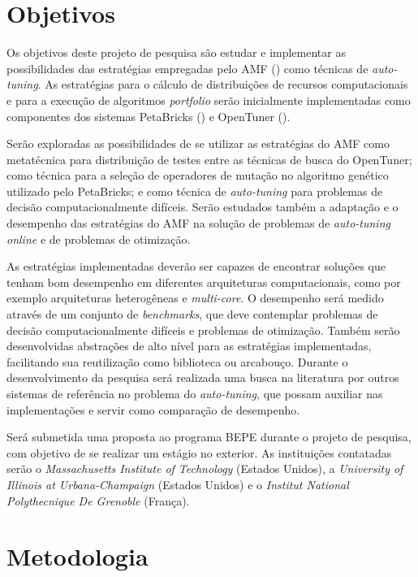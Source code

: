 \documentclass[a4paper, 12pt]{article}
\begin{document}
\section{Objetivos} \label{sec:obj}

Os objetivos deste projeto de pesquisa são estudar e implementar as
possibilidades das estratégias empregadas pelo AMF
(\citet{goldman2012framework}) como técnicas de \emph{auto-tuning}.
As estratégias para o cálculo de distribuições de recursos computacionais
e para a execução de algoritmos \emph{portfolio} serão inicialmente
implementadas como componentes dos sistemas PetaBricks (\citet{ansel2014phd}) e
OpenTuner (\citet{ansel2013opentuner}).

Serão exploradas as possibilidades de se utilizar as estratégias
do AMF como metatécnica para distribuição de testes entre as técnicas de busca
do OpenTuner; como técnica para a seleção de operadores de mutação no algoritmo
genético utilizado pelo PetaBricks; e como técnica de \emph{auto-tuning} para
problemas de decisão computacionalmente difíceis. Serão estudados também a
adaptação e o desempenho das estratégias do AMF na solução de problemas de
\emph{auto-tuning online} e de problemas de otimização.

As estratégias implementadas deverão ser capazes de encontrar soluções que
tenham bom desempenho em diferentes arquiteturas computacionais,
como por exemplo arquiteturas heterogêneas e \emph{multi-core}.
O desempenho será medido através de um conjunto de \emph{benchmarks}, que deve
contemplar problemas de decisão computacionalmente difíceis e problemas
de otimização. Também serão desenvolvidas abstrações de alto nível para
as estratégias implementadas, facilitando sua reutilização como
biblioteca ou arcabouço.
Durante o desenvolvimento da pesquisa será realizada uma busca na literatura
por outros sistemas de referência no problema do \emph{auto-tuning}, que possam
auxiliar nas implementações e servir como comparação de desempenho.

Será submetida uma proposta ao programa BEPE durante o projeto de
pesquisa, com objetivo de se realizar um estágio no exterior. As
instituições contatadas serão o \emph{Massachusetts Institute of Technology}
(Estados Unidos), a \emph{University of Illinois at Urbana-Champaign}
(Estados Unidos) e o \emph{Institut National Polythecnique De Grenoble}
(França).


\section{Metodologia} \label{sec:met}
\end{document}
